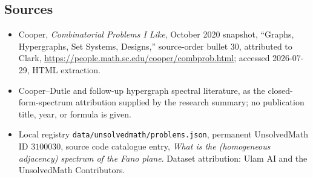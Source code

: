 \documentclass[11pt]{article}
\begin{document}
\subsection{Sources}
\begin{itemize}
\item Cooper, \emph{Combinatorial Problems I Like}, October 2020 snapshot, ``Graphs, Hypergraphs, Set Systems, Designs,'' source-order bullet 30, attributed to Clark, \url{https://people.math.sc.edu/cooper/combprob.html}; accessed 2026-07-29, HTML extraction.
\item Cooper--Dutle and follow-up hypergraph spectral literature, as the closed-form-spectrum attribution supplied by the research summary; no publication title, year, or formula is given.
\item Local registry \texttt{data/unsolvedmath/problems.json}, permanent UnsolvedMath ID $3100030$, source code catalogue entry, \emph{What is the (homogeneous adjacency) spectrum of the Fano plane}. Dataset attribution: Ulam AI and the UnsolvedMath Contributors.
\end{itemize}
\end{document}
